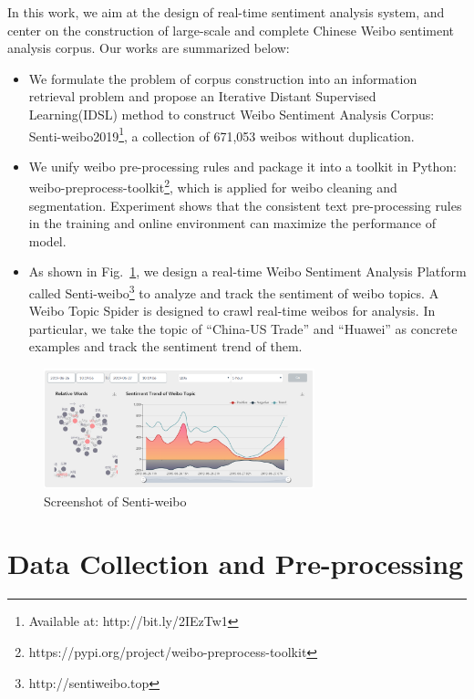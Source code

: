 \documentclass[runningheads]{llncs}
\begin{document}
In this work, we aim at the design of real-time sentiment analysis system, and center on the construction of large-scale and complete Chinese Weibo sentiment analysis corpus. Our works are summarized below:

\begin{itemize}
\item We formulate the problem of corpus construction into an information retrieval problem and propose an Iterative Distant Supervised Learning(IDSL) method to construct Weibo Sentiment Analysis Corpus: Senti-weibo2019\footnote{Available at: http://bit.ly/2IEzTw1}, a collection of 671,053 weibos without duplication.
\item We unify weibo pre-processing rules and package it into a toolkit in Python: weibo-preprocess-toolkit\footnote{https://pypi.org/project/weibo-preprocess-toolkit}, which is applied for weibo cleaning and segmentation. Experiment shows that the consistent text pre-processing rules in the training and online environment can maximize the performance of model.
\item As shown in Fig.~\ref{fig:system-screenshot}, we design a real-time Weibo Sentiment Analysis Platform called Senti-weibo\footnote{http://sentiweibo.top} to analyze and track the sentiment of weibo topics. A Weibo Topic Spider is designed to crawl real-time weibos for analysis. In particular, we take the topic of ``China-US Trade'' and ``Huawei'' as concrete examples and track the sentiment trend of them.
\end{itemize}


\begin{figure}[htp]
\begin{center}
\includegraphics[width=0.7\textwidth]{images/system-screenshot.png}
\caption{Screenshot of Senti-weibo}
\label{fig:system-screenshot}
\end{center}
\end{figure}

\section{Data Collection and Pre-processing}
\end{document}
